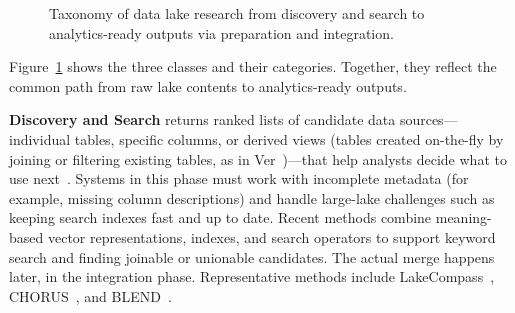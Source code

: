 \documentclass[sigconf]{acmart}
\begin{document}
\begin{figure}[t]
\caption{Taxonomy of data lake research from discovery and search to analytics-ready outputs via preparation and integration.}
\label{fig:taxonomy}
\end{figure}


Figure~\ref{fig:taxonomy} shows the three classes and their categories. Together, they reflect the common path from raw lake contents to analytics-ready outputs.

\textbf{Discovery and Search} returns ranked lists of candidate data sources---individual tables, specific columns, or derived views (tables created on-the-fly by joining or filtering existing tables, as in Ver~\cite{10184768})---that help analysts decide what to use next~\cite{10.14778/3681954.3682005}. Systems in this phase must work with incomplete metadata (for example, missing column descriptions) and handle large-lake challenges such as keeping search indexes fast and up to date. Recent methods combine meaning-based vector representations, indexes, and search operators to support keyword search and finding joinable or unionable candidates. The actual merge happens later, in the integration phase. Representative methods include LakeCompass~\cite{10.14778/3685800.3685880}, CHORUS~\cite{10.14778/3659437.3659461}, and BLEND~\cite{11112882}.
\end{document}
